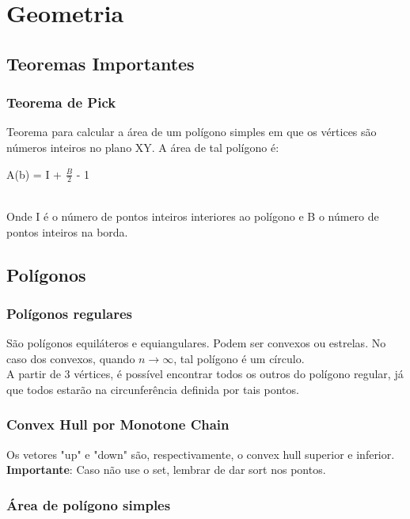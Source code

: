 \section{Geometria}

\subsection{Teoremas Importantes}

\subsubsection{Teorema de Pick}
Teorema para calcular a \'{a}rea de um pol\'{i}gono simples em que os v\'{e}rtices são n\'{u}meros inteiros no plano XY. A \'{a}rea de tal pol\'{i}gono é: 
\\\centerline{A(b) = I + $\frac{B}{2}$ - 1}
\\Onde I \'{e} o n\'{u}mero de pontos inteiros interiores ao pol\'{i}gono e B o n\'{u}mero de pontos inteiros na borda.
\divisor



\subsection{Pol\'{i}gonos}
\subsubsection{Pol\'{i}gonos regulares}
S\~{a}o pol\'{i}gonos equil\'{a}teros e equiangulares. Podem ser convexos ou estrelas. No caso dos convexos, quando $n\rightarrow\infty$, tal pol\'{i}gono \'{e} um c\'{i}rculo.
\\ A partir de 3 v\'{e}rtices, \'{e} poss\'{i}vel encontrar todos os outros do pol\'{i}gono regular, j\'{a} que todos estar\~{a}o na circunfer\^{e}ncia definida por tais pontos. 
\divisor

\subsubsection{Convex Hull por Monotone Chain}
Os vetores "up" e "down" s\~{a}o, respectivamente, o convex hull superior e inferior.
\\ \textbf{Importante}: Caso n\~{a}o use o set, lembrar de dar sort nos pontos.
\divisor

\subsubsection{\'{A}rea de pol\'{i}gono simples}
\divisor

